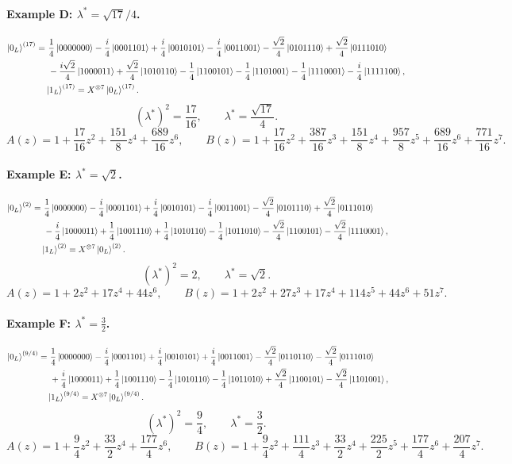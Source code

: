 \documentclass[11pt]{article}
\begin{document}
\paragraph{Example D: \texorpdfstring{$\lambda^\ast=\sqrt{17}/4$}{lambda*=sqrt17/4}.}
\[
\begin{aligned}
\ket{0_L}^{(17)}=
&\ \frac{1}{4}\ket{0000000}
-\frac{i}{4}\ket{0001101}
+\frac{i}{4}\ket{0010101}
-\frac{i}{4}\ket{0011001}
-\frac{\sqrt2}{4}\ket{0101110}
+\frac{\sqrt2}{4}\ket{0111010}\\
&\ -\frac{i\sqrt2}{4}\ket{1000011}
+\frac{\sqrt2}{4}\ket{1010110}
-\frac{1}{4}\ket{1100101}
-\frac{1}{4}\ket{1101001}
-\frac{1}{4}\ket{1110001}
-\frac{i}{4}\ket{1111100},\\
&\ket{1_L}^{(17)}=X^{\otimes 7}\ket{0_L}^{(17)}.
\end{aligned}
\]
\[
\boxed{(\lambda^\ast)^2=\frac{17}{16},\qquad \lambda^\ast=\frac{\sqrt{17}}{4}.}
\]
\[
A(z)=1+\frac{17}{16}z^2+\frac{151}{8}z^4+\frac{689}{16}z^6,\qquad
B(z)=1+\frac{17}{16}z^2+\frac{387}{16}z^3+\frac{151}{8}z^4+\frac{957}{8}z^5+\frac{689}{16}z^6+\frac{771}{16}z^7.
\]

\paragraph{Example E: \texorpdfstring{$\lambda^\ast=\sqrt2$}{lambda*=sqrt2}.}
\[
\begin{aligned}
\ket{0_L}^{(2)}=
&\ \frac{1}{4}\ket{0000000}
-\frac{i}{4}\ket{0001101}
+\frac{i}{4}\ket{0010101}
-\frac{i}{4}\ket{0011001}
-\frac{\sqrt2}{4}\ket{0101110}
+\frac{\sqrt2}{4}\ket{0111010}\\
&\ -\frac{i}{4}\ket{1000011}
+\frac{1}{4}\ket{1001110}
+\frac{1}{4}\ket{1010110}
-\frac{1}{4}\ket{1011010}
-\frac{\sqrt2}{4}\ket{1100101}
-\frac{\sqrt2}{4}\ket{1110001},\qquad\\
&\ket{1_L}^{(2)}=X^{\otimes 7}\ket{0_L}^{(2)}.
\end{aligned}
\]
\[
\boxed{(\lambda^\ast)^2=2,\qquad \lambda^\ast=\sqrt2.}
\]
\[
A(z)=1+2z^2+17z^4+44z^6,\qquad
B(z)=1+2z^2+27z^3+17z^4+114z^5+44z^6+51z^7.
\]

\paragraph{Example F: \texorpdfstring{$\lambda^\ast=\frac{3}{2}$}{lambda*=3/2}.}
\[
\begin{aligned}
\ket{0_L}^{(9/4)}=
&\ \frac{1}{4}\ket{0000000}
-\frac{i}{4}\ket{0001101}
+\frac{i}{4}\ket{0010101}
+\frac{i}{4}\ket{0011001}
-\frac{\sqrt2}{4}\ket{0110110}
-\frac{\sqrt2}{4}\ket{0111010}\\
&\ +\frac{i}{4}\ket{1000011}
+\frac{1}{4}\ket{1001110}
-\frac{1}{4}\ket{1010110}
-\frac{1}{4}\ket{1011010}
+\frac{\sqrt2}{4}\ket{1100101}
-\frac{\sqrt2}{4}\ket{1101001},\qquad\\
&\ket{1_L}^{(9/4)}=X^{\otimes 7}\ket{0_L}^{(9/4)}.
\end{aligned}
\]
\[
\boxed{(\lambda^\ast)^2=\frac{9}{4},\qquad \lambda^\ast=\frac{3}{2}.}
\]
\[
A(z)=1+\frac{9}{4}z^2+\frac{33}{2}z^4+\frac{177}{4}z^6,\qquad
B(z)=1+\frac{9}{4}z^2+\frac{111}{4}z^3+\frac{33}{2}z^4+\frac{225}{2}z^5+\frac{177}{4}z^6+\frac{207}{4}z^7.
\]
\end{document}
